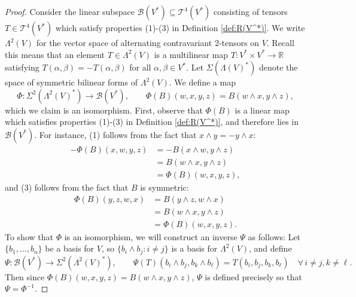 \documentclass{amsart}
\numberwithin{equation}{section}
\def\~#1{\mathscr{#1}}
\newcommand{\R}{\mathbb{R}}
\theoremstyle{plain}
\theoremstyle{definition}
\theoremstyle{remark}
\begin{document}
\begin{proof}
Consider the linear subspace $\~B(V^*) \subseteq \~T^4(V^*)$ consisting of tensors $T \in \~T^4(V^*)$ which satisfy properties (1)-(3) in Definition \ref{def:R(V^*)}. We write $\Lambda^2(V)$ for the vector space of alternating contravariant $2$-tensors on $V$. Recall this means that an element $T \in \Lambda^2(V)$ is a multilinear map $T: V^* \times V^* \to \R$ satisfying $T(\alpha, \beta) = -T(\alpha, \beta)$ for all $\alpha, \beta \in V^*$. Let $\Sigma(\Lambda(V)^*)$ denote the space of symmetric bilinear forms of $\Lambda^2(V)$. We define a map
\[\Phi: \Sigma^2(\Lambda^2(V)^*) \to \~B(V^*), \qquad \Phi(B)(w,x,y,z) = B(w \wedge x, y \wedge z),\]
which we claim is an isomorphism. First, observe that $\Phi(B)$ is a linear map which satisfies properties (1)-(3) in Definition \ref{def:R(V^*)}, and therefore lies in $\~B(V^*)$. For instance, (1) follows from the fact that $x \wedge y = -y \wedge x$:
\begin{align*}
    -\Phi(B)(x,w,y,z) &= -B(x \wedge w, y\wedge z) \\ 
    &= B(w \wedge x, y \wedge z) \\ 
    &= \Phi(B)(w,x,y,z),
\end{align*}
and (3) follows from the fact that $B$ is symmetric:
\begin{align*}
    \Phi(B)(y, z, w, x) &= B(y \wedge z, w\wedge x) \\ 
    &= B(w \wedge x, y \wedge z) \\ 
    &= \Phi(B)(w,x,y,z).
\end{align*}
To show that $\Phi$ is an isomorphism, we will construct an inverse $\Psi$ as follows: Let $\{b_1, \ldots, b_n\}$ be a basis for $V$, so $\{b_i \wedge b_j : i \ne j\}$ is a basis for $\Lambda^2(V)$, and define
\[\Psi: \~B(V^*) \to \Sigma^2(\Lambda^2(V)^*), \qquad \Psi(T)\left(b_i \wedge b_j, b_k \wedge b_\ell \right) = T(b_i,b_j,b_k,b_\ell) \quad \forall\, i \ne j, k \ne \ell.\]
Then since $\Phi(B)(w,x,y,z) = B(w \wedge x, y \wedge z)$, $\Psi$ is defined precisely so that $\Psi = \Phi^{-1}$. 


\end{proof}
\end{document}
